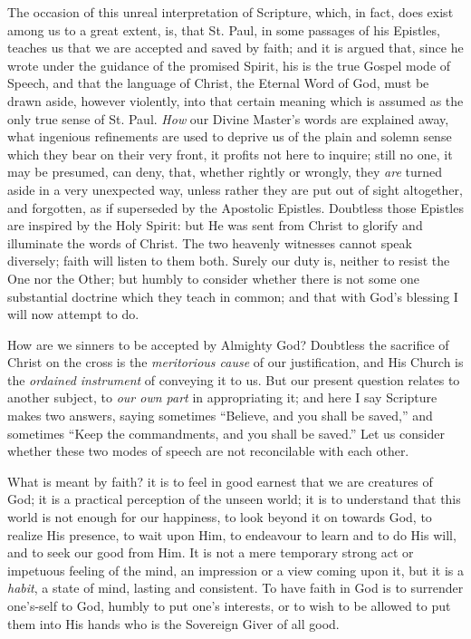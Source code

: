The occasion of this unreal interpretation of Scripture, which, in
fact, does exist among us to a great extent, is, that St. Paul, in
some passages of his Epistles, teaches us that we are accepted and
saved by faith; and it is argued that, since he wrote under the
guidance of the promised Spirit, his is the true Gospel mode of
Speech, and that the language of Christ, the Eternal Word of God, must
be drawn aside, however violently, into that certain meaning which is
assumed as the only true sense of St. Paul. \emph{How} our Divine
Master's words are explained away, what ingenious refinements are
used to deprive us of the plain and solemn sense which they bear on
their very front, it profits not here to inquire; still no one, it may
be presumed, can deny, that, whether rightly or wrongly, they \emph{are}
turned aside in a very unexpected way, unless rather they are put out
of sight altogether, and forgotten, as if superseded by the Apostolic
Epistles. Doubtless those Epistles are inspired by the Holy Spirit:
but He was sent from Christ to glorify and illuminate the words of
Christ. The two heavenly witnesses cannot speak diversely; faith will
listen to them both. Surely our duty is, neither to resist the One nor
the Other; but humbly to consider whether there is not some one
substantial doctrine which they teach in common; and that with God's
blessing I will now attempt to do.

How are we sinners to be accepted by Almighty God? Doubtless the
sacrifice of Christ on the cross is the \emph{meritorious cause} of
our justification, and His Church is the \emph{ordained instrument} of
conveying it to us. But our present question relates to another
subject, to \emph{our own part} in appropriating it; and here I say
Scripture makes two answers, saying sometimes ``Believe, and you
shall be saved,'' and sometimes ``Keep the commandments, and
you shall be saved.'' Let us consider whether these two modes of
speech are not reconcilable with each other.

What is meant by faith? it is to feel in good earnest that we are
creatures of God; it is a practical perception of the unseen world; it
is to understand that this world is not enough for our happiness, to
look beyond it on towards God, to realize His presence, to wait upon
Him, to endeavour to learn and to do His will, and to seek our good
from Him. It is not a mere temporary strong act or impetuous feeling
of the mind, an impression or a view coming upon it, but it is a \emph{habit},
a state of mind, lasting and consistent. To have faith in God is to
surrender one's-self to God, humbly to put one's interests, or to
wish to be allowed to put them into His hands who is the Sovereign
Giver of all good.

